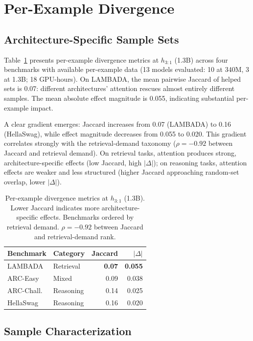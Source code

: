 \documentclass[11pt]{article}
\begin{document}
\section{Per-Example Divergence}
\label{sec:perexample}

\subsection{Architecture-Specific Sample Sets}

Table~\ref{tab:perexample} presents per-example divergence metrics at $h_{3:1}$ (1.3B) across four benchmarks with available per-example data (13 models evaluated: 10 at 340M, 3 at 1.3B; 18 GPU-hours).
On LAMBADA, the mean pairwise Jaccard of helped sets is 0.07: different architectures' attention rescues almost entirely different samples.
The mean absolute effect magnitude is 0.055, indicating substantial per-example impact.

A clear gradient emerges: Jaccard increases from 0.07 (LAMBADA) to 0.16 (HellaSwag), while effect magnitude decreases from 0.055 to 0.020.
This gradient correlates strongly with the retrieval-demand taxonomy ($\rho = {-}0.92$ between Jaccard and retrieval demand).
On retrieval tasks, attention produces strong, architecture-specific effects (low Jaccard, high $|\Delta|$); on reasoning tasks, attention effects are weaker and less structured (higher Jaccard approaching random-set overlap, lower $|\Delta|$).

\begin{table}[t]
\centering
\caption{Per-example divergence metrics at $h_{3:1}$ (1.3B). Lower Jaccard indicates more architecture-specific effects. Benchmarks ordered by retrieval demand. $\rho = {-}0.92$ between Jaccard and retrieval-demand rank.}
\label{tab:perexample}
\small
\begin{tabular}{llrr}
\toprule
Benchmark & Category & Jaccard & $|\Delta|$ \\
\midrule
LAMBADA & Retrieval & \textbf{0.07} & \textbf{0.055} \\
ARC-Easy & Mixed & 0.09 & 0.038 \\
ARC-Chall. & Reasoning & 0.14 & 0.025 \\
HellaSwag & Reasoning & 0.16 & 0.020 \\
\bottomrule
\end{tabular}
\end{table}

\subsection{Sample Characterization}
\label{sec:characterization}
\end{document}
